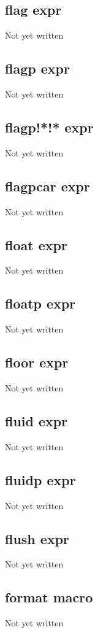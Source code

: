 \documentclass[a4paper,11pt]{article}
\begin{document}
{\subsection{\ttfamily flag expr}
   Not yet written

\subsection{\ttfamily flagp expr}
   Not yet written

\subsection{\ttfamily flagp!*!* expr}
   Not yet written

\subsection{\ttfamily flagpcar expr}
   Not yet written

\subsection{\ttfamily float expr}
   Not yet written

\subsection{\ttfamily floatp expr}
   Not yet written

\subsection{\ttfamily floor expr}
   Not yet written

\subsection{\ttfamily fluid expr}
   Not yet written

\subsection{\ttfamily fluidp expr}
   Not yet written

\subsection{\ttfamily flush expr}
   Not yet written

\subsection{\ttfamily format macro}
   Not yet written

}
\end{document}
